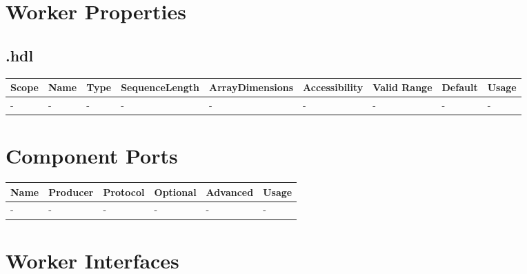 \begin{landscape}
	\section*{Worker Properties}
	\subsection*{\comp.hdl}
	\begin{scriptsize}
		\begin{tabular}{|p{2cm}|p{2cm}|p{1cm}|p{2cm}|p{2cm}|p{2cm}|p{2cm}|p{1cm}|p{4.58cm}|}
			\hline
			\rowcolor{blue}
			Scope        & Name                 & Type & SequenceLength & ArrayDimensions & Accessibility & Valid Range        & Default & Usage                                                                                                                  \\
			\hline
			- & - & - & - & - & - & - & - & - \\
			\hline
		\end{tabular}
	\end{scriptsize}

	\section*{Component Ports}
	\begin{scriptsize}
		\begin{tabular}{|p{2cm}|p{1.5cm}|p{4cm}|p{1.5cm}|p{1.5cm}|p{9.38cm}|}
			\hline
			\rowcolor{blue}
			Name & Producer & Protocol           & Optional & Advanced & Usage                  \\
			\hline
			-  & -     & - & -     & -        & - \\
			\hline
		\end{tabular}
	\end{scriptsize}
	\section*{Worker Interfaces}

\end{landscape}
